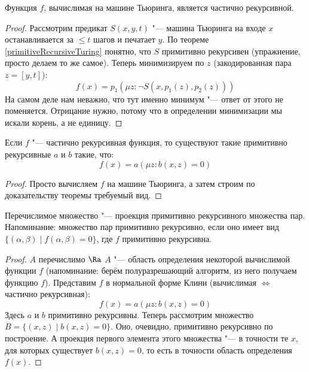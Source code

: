 \begin{theorem}
	Функция $f$, вычислимая на машине Тьюринга, является частично рекурсивной.
\end{theorem}
\begin{proof}
	Рассмотрим предикат $S(x, y, t)$ "--- машина Тьюринга на входе $x$ останавливается за $\le t$ шагов и печатает $y$.
	По теореме \ref{primitiveRecursiveTuring} понятно, что $S$ примитивно рекурсивен (упражнение, просто делаем то же самое).
	Теперь минимизируем по $z$ (закодированная пара $z=[y, t]$):
	\[ f(x) = p_1(\mu z \colon \lnot S(x, p_1(z), p_2(z))) \]
	На самом деле нам неважно, что тут именно минимум "--- ответ от этого не поменяется.
	Отрицание нужно, потому что в определении минимизации мы искали корень, а не единицу.
\end{proof}
\begin{conseq}
	Если $f$ "--- частично рекурсивная функция, то существуют такие примитивно рекурсивные $a$ и $b$ такие, что:
	\[ f(x) = a(\mu z \colon b(x, z) = 0) \]
\end{conseq}
\begin{proof}
	Просто вычисляем $f$ на машине Тьюринга, а затем строим по доказательству теоремы требуемый вид.
\end{proof}

\begin{assertion}
	Перечислимое множество "--- проекция примитивно рекурсивного множества пар.
	Напоминание: множество пар примитивно рекурсивно, если оно имеет вид $\{(\alpha, \beta) \mid f(\alpha, \beta)=0\}$, где $f$ примитивно рекурсивна.
\end{assertion}
\begin{proof}
	$A$ перечислимо $\Ra$ $A$ "--- область определения некоторой вычислимой функции $f$
	(напоминание: берём полуразрешающий алгоритм, из него получаем функцию $f$).
	Представим $f$ в нормальной форме Клини (вычислимая $\iff$ частично рекурсивная):
	\[ f(x) = a(\mu z \colon b(x, z) = 0) \]
	Здесь $a$ и $b$ примитивно рекурсивны.
	Теперь рассмотрим множество $B=\{ (x,z) \mid b(x, z) = 0 \}$.
	Оно, очевидно, примитивно рекурсивно по построение.
	А проекция первого элемента этого множества "--- в точности те $x$, для которых существует $b(x, z)=0$,
	то есть в точности область определения $f(x)$.
\end{proof}
